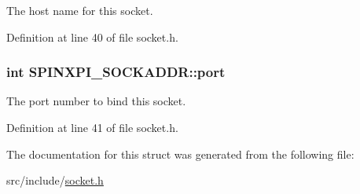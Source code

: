 The host name for this socket. 



Definition at line 40 of file socket.\-h.

\hypertarget{structSPINXPI__SOCKADDR_a9c502c5085ee437d3493e348e1f07989}{
\subsubsection[{port}]{\setlength{\rightskip}{0pt plus 5cm}int S\-P\-I\-N\-X\-P\-I\-\_\-\-S\-O\-C\-K\-A\-D\-D\-R\-::port}}\label{structSPINXPI__SOCKADDR_a9c502c5085ee437d3493e348e1f07989}


The port number to bind this socket. 



Definition at line 41 of file socket.\-h.



The documentation for this struct was generated from the following file\-:\begin{DoxyCompactItemize}
\item 
src/include/\hyperlink{socket_8h}{socket.\-h}\end{DoxyCompactItemize}
